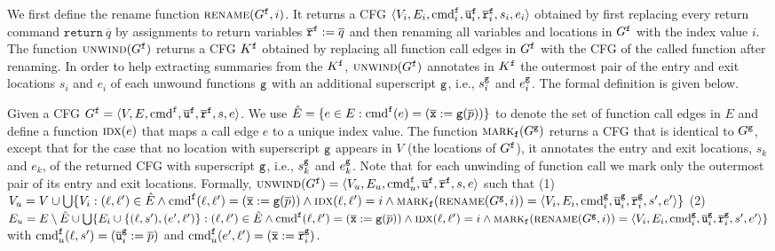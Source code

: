 We first define the rename function $\textsc{rename}(G^{\mathtt{{f}}},i)$. It returns a CFG $\langle V_i, E_i,\textmd{cmd}_i^{\mathtt{{f}}}, \overline{\texttt{u}}_i^{\mathtt{{f}}}, \overline{\texttt{r}}_i^{\mathtt{{f}}},s_i,e_i \rangle$ obtained by first replacing every return command $\mathtt{return}\ \overline{q}$ by assignments to return variables $\overline{\texttt{r}}^{\mathtt{{f}}} := \overline{q}$ and then renaming all variables and locations in $G^{\mathtt{{f}}}$ with the index value $i$. The function $\textsc{unwind}(G^{\mathtt{{f}}})$ returns a CFG $K^{\mathtt{{f}}}$ obtained by replacing all function call edges in $G^{\mathtt{{f}}}$ with the CFG of the called function after renaming. In order to help extracting summaries from the $K^{\mathtt{{f}}}$, $\textsc{unwind}(G^{\mathtt{{f}}})$ annotates in $K^{\mathtt{{f}}}$ the outermost pair of the entry and exit locations ${s_i}$ and ${e_i}$ of each unwound functions $\mathtt{{g}}$ with an additional superscript $\mathtt{{g}}$, i.e., $s_i^{\mathtt{{g}}}$ and $e_i^{\mathtt{{g}}}$. The formal definition is given below.

Given a CFG $G^{\mathtt{{f}}}=\langle
V, E,\textmd{cmd}^{\mathtt{{f}}}, \overline{\texttt{u}}^{\mathtt{{f}}}, \overline{\texttt{r}}^{\mathtt{{f}}},s,e \rangle$.
We use $\hat{E} =\{e\in E: \textmd{cmd}^{\mathtt{{f}}} (e)= (\overline{\texttt{x}}:=\mathtt{g}(\overline{p}))\}$ to denote the set of function call edges in $E$ and define a function $\textsc{idx}(e)$ that maps a call edge $e$ to a unique index value.
The function $\textsc{mark}_{\mathtt{{f}}}(G^{\mathtt{{g}}})$ returns a CFG that is identical to $G^{\mathtt{{g}}}$, except that for the case that no location with superscript $\mathtt{{g}}$ appears in $V$ (the locations of $G^{\mathtt{{f}}}$), it annotates the entry and exit locations, $s_k$ and $e_k$, of the returned CFG with superscript $\mathtt{{g}}$, i.e., $s_k^{\mathtt{{g}}}$ and $e_k^{\mathtt{{g}}}$. Note that for each unwinding of function call we mark only the outermost pair of its entry and exit locations.
Formally, $\textsc{unwind}(G^{\mathtt{{f}}}) = \langle V_u, E_u,\textmd{cmd}_u^{\mathtt{{f}}}, \overline{\texttt{u}}^{\mathtt{{f}}}, \overline{\texttt{r}}^{\mathtt{{f}}},s,e \rangle$ such that 
(1) $V_u = V\cup \bigcup\{V_i:(\ell, \ell')\in \hat{E} \wedge \textmd{cmd}^{\mathtt{{f}}}(\ell, \ell')=(\overline{\texttt{x}}:=\mathtt{g}(\overline{p}))\wedge \textsc{idx}(\ell, \ell')=i \wedge 
\textsc{mark}_{\mathtt{{f}}}(\textsc{rename}(G^{\mathtt{{g}}},i))=
\langle V_i, E_i,\textmd{cmd}^{\mathtt{{g}}}_i, \overline{\texttt{u}}^{\mathtt{{g}}}_i, \overline{\texttt{r}}^{\mathtt{{g}}}_i,s',e'\rangle \}$ 
(2) $E_u= E \setminus \hat{E} \cup \bigcup\{E_i\cup\{(\ell, s'),(e', \ell')\}: (\ell, \ell')\in \hat{E} \wedge 
\textmd{cmd}^{\mathtt{{f}}}(\ell, \ell')=(\overline{\texttt{x}}:=\mathtt{g}(\overline{p}))\wedge \textsc{idx}(\ell, \ell')=i \wedge 
\textsc{mark}_{\mathtt{{f}}}(\textsc{rename}(G^{\mathtt{{g}}},i))=
\langle V_i, E_i,\textmd{cmd}^{\mathtt{{g}}}_i, \overline{\texttt{u}}^{\mathtt{{g}}}_i, \overline{\texttt{r}}^{\mathtt{{g}}}_i,s',e'\rangle \}$ with $\textmd{cmd}_u^{\mathtt{{f}}} (\ell, s') = (\overline{\texttt{u}}_i^{\mathtt{{g}}}:=\overline{p})$ and $\textmd{cmd}_u^{\mathtt{{f}}} (e', \ell') = (\overline{\texttt{x}}:=\overline{\texttt{r}}^{\mathtt{{g}}}_i)$.


